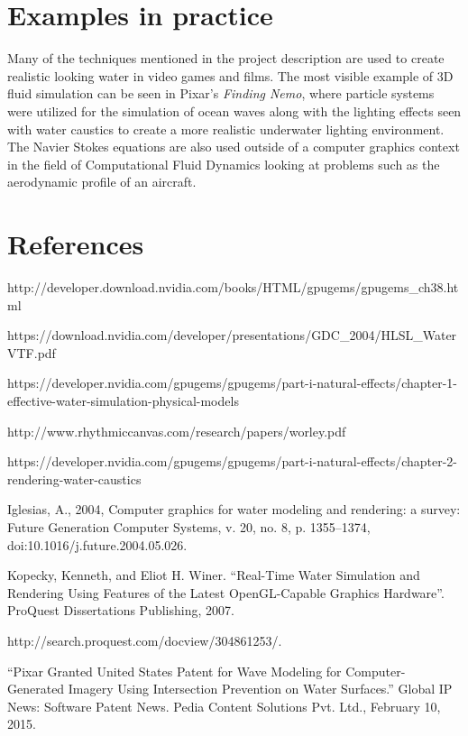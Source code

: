 \documentclass[11pt]{article}
\begin{document}
\section{Examples in practice}

Many of the techniques mentioned in the project description are used to create realistic looking water in video games and films. The most visible example of 3D fluid simulation can be seen in Pixar's \textit{Finding Nemo}, where particle systems were utilized for the simulation of ocean waves along with the lighting effects seen with water caustics to create a more realistic underwater lighting environment. The Navier Stokes equations are also used outside of a computer graphics context in the field of Computational Fluid Dynamics looking at problems such as the aerodynamic profile of an aircraft. 

\section{References} 

http://developer.download.nvidia.com/books/HTML/gpugems/gpugems\_ch38.html

\noindent https://download.nvidia.com/developer/presentations/GDC\_2004/HLSL\_WaterVTF.pdf

\noindent https://developer.nvidia.com/gpugems/gpugems/part-i-natural-effects/chapter-1-effective-water-simulation-physical-models

\noindent http://www.rhythmiccanvas.com/research/papers/worley.pdf

\noindent https://developer.nvidia.com/gpugems/gpugems/part-i-natural-effects/chapter-2-rendering-water-caustics

\noindent Iglesias, A., 2004, Computer graphics for water modeling and rendering: a survey: Future Generation Computer Systems, v. 20, no. 8, p. 1355–1374, doi:10.1016/j.future.2004.05.026.

\noindent Kopecky, Kenneth, and Eliot H. Winer. “Real-Time Water Simulation and Rendering Using Features of the Latest OpenGL-Capable Graphics Hardware”. ProQuest Dissertations Publishing, 2007.

http://search.proquest.com/docview/304861253/.

\noindent “Pixar Granted United States Patent for Wave Modeling for Computer-Generated Imagery Using Intersection Prevention on Water Surfaces.” Global IP News: Software Patent News. Pedia Content Solutions Pvt. Ltd., February 10, 2015.
\end{document}
